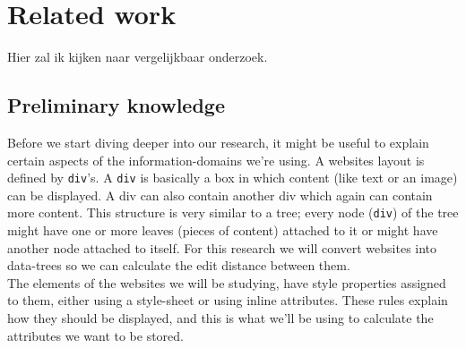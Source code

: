 \chapter{Related work}\label{relatedwork}
Hier zal ik kijken naar vergelijkbaar onderzoek.

\section{Preliminary knowledge}
Before we start diving deeper into our research, it might be useful to explain certain aspects of the information-domains we're using.
A websites layout is defined by \texttt{div}'s. A \texttt{div} is basically a box in which content (like text or an image) can be displayed. A div can also contain another div which again can contain more content. This structure is very similar to a tree; every node (\texttt{div}) of the tree might have one or more leaves (pieces of content) attached to it or might have another node attached to itself. For this research we will convert websites into data-trees so we can calculate the edit distance between them.\\
The elements of the websites we will be studying, have style properties assigned to them, either using a style-sheet or using inline attributes. These rules explain how they should be displayed, and this is what we'll be using to calculate the attributes we want to be stored.
